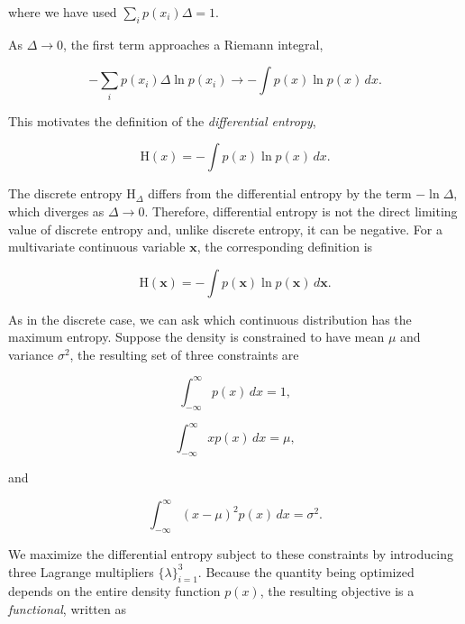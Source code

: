 \documentclass[10pt,twocolumn]{memoir}
\begin{document}
where we have used $\sum_i p(x_i)\Delta=1$.

As $\Delta\to 0$, the first term approaches a Riemann integral,

\begin{equation}
    -\sum_i p(x_i)\Delta\ln p(x_i)\longrightarrow -\int p(x)\ln p(x)\,dx.
\end{equation}

This motivates the definition of the \textit{differential entropy},

\begin{equation}
    \mathrm{H}(x) = -\int p(x)\ln p(x)\,dx.
\label{eq:c1_entropy_continuous_distribution}
\end{equation}

The discrete entropy $\mathrm{H}_{\Delta}$ differs from the differential entropy by the term $-\ln\Delta$, which diverges as $\Delta\to 0$. Therefore, differential entropy is not the direct limiting value of discrete entropy and, unlike discrete entropy, it can be negative. For a multivariate continuous variable $\mathbf{x}$, the corresponding definition is

\begin{equation}
    \mathrm{H}(\mathbf{x}) = -\int p(\mathbf{x})\ln p(\mathbf{x})\,d\mathbf{x}.
\end{equation}

As in the discrete case, we can ask which continuous distribution has the maximum entropy. Suppose the density is constrained to have mean $\mu$ and variance $\sigma^2$, the resulting set of three constraints are

\begin{equation}
    \int_{-\infty}^{\infty} p(x)\,dx = 1,
\end{equation}

\begin{equation}
    \int_{-\infty}^{\infty} x p(x)\,dx = \mu,
\end{equation}

and

\begin{equation}
    \int_{-\infty}^{\infty} (x-\mu)^2 p(x)\,dx = \sigma^2.
\end{equation}

We maximize the differential entropy subject to these constraints by introducing three Lagrange multipliers $\{\lambda\}^3_{i=1}$. Because the quantity being optimized depends on the entire density function $p(x)$, the resulting objective is a \textit{functional}, written as
\end{document}
